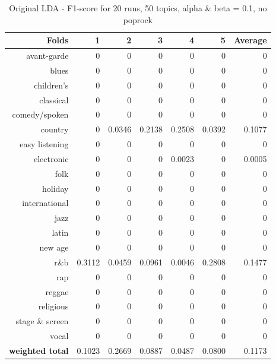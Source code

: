 \begin{table}[h]\label{table:original_nopoprock}
\begin{center}
\begin{tabular}{| r | r | r | r | r | r | r |}
\hline
\textbf{Folds} &  \textbf{1} & \textbf{2} & \textbf{3} & \textbf{4} & \textbf{5} & \textbf{Average}\\
\hline
avant-garde 	& 0 	& 0	 	& 0 	& 0 	& 0 	& 0\\
blues 			& 0 	& 0 	& 0 	& 0 	& 0 	& 0\\
children's 		& 0 	& 0 	& 0 	& 0 	& 0 	& 0\\
classical 		& 0 	& 0  	& 0 	& 0 	& 0 	& 0\\
comedy/spoken 	& 0 	& 0 	& 0 	& 0 	& 0	 	& 0 \\
country			& 0 	& 0.0346 & 0.2138 & 0.2508 	& 0.0392 & 0.1077 \\
easy listening 	& 0 	& 0 	& 0 	& 0 	& 0 	& 0 \\
electronic 		& 0 	& 0 	& 0 	& 0.0023 & 0 	& 0.0005\\
folk 			& 0 	& 0 	& 0 	& 0 	& 0 	& 0\\
holiday 		& 0 	& 0 	& 0 	& 0 	& 0 	& 0 \\
international 	& 0 	& 0 	& 0 	& 0 	& 0 	& 0\\
jazz 			& 0 	& 0 	& 0 	& 0 	& 0 	& 0 \\
latin 			& 0 	& 0 	& 0 	& 0 	& 0 	& 0\\
new age 		& 0 	& 0 	& 0 	& 0 	& 0 	& 0\\
r\&b 			& 0.3112 & 0.0459 & 0.0961 & 0.0046 & 0.2808 & 0.1477\\
rap 			& 0 	& 0 	& 0 	& 0 	& 0 	& 0\\
reggae 			& 0 	& 0 	& 0 	& 0 	& 0 	& 0\\
religious 		& 0 	& 0 	& 0 	& 0 	& 0 	& 0\\
stage \& screen & 0 	& 0 	& 0 	& 0 	& 0 	& 0\\
vocal 			& 0 	& 0 	& 0 	& 0 	& 0 	& 0\\
\hline
\textbf{weighted total} &  0.1023 & 0.2669 & 0.0887 & 0.0487 & 0.0800 & 0.1173\\
\hline
\end{tabular}
\end{center}
\caption{Original LDA - F1-score for 20 runs, 50 topics, alpha \& beta = 0.1, no poprock}
\end{table}